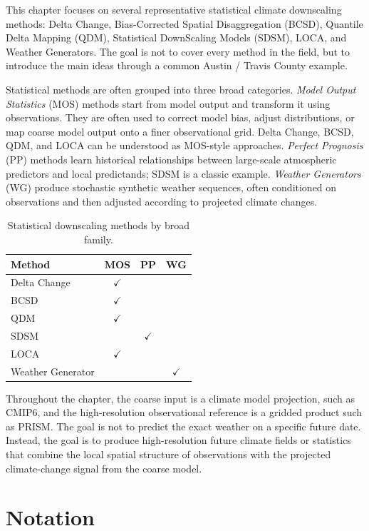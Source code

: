 \documentclass[11pt]{article}
\begin{document}
This chapter focuses on several representative statistical climate downscaling methods: Delta Change, Bias-Corrected Spatial Disaggregation (BCSD), Quantile Delta Mapping (QDM), Statistical DownScaling Models (SDSM), LOCA, and Weather Generators. The goal is not to cover every method in the field, but to introduce the main ideas through a common Austin / Travis County example.

Statistical methods are often grouped into three broad categories. \emph{Model Output Statistics} (MOS) methods start from model output and transform it using observations. They are often used to correct model bias, adjust distributions, or map coarse model output onto a finer observational grid. Delta Change, BCSD, QDM, and LOCA can be understood as MOS-style approaches. \emph{Perfect Prognosis} (PP) methods learn historical relationships between large-scale atmospheric predictors and local predictands; SDSM is a classic example. \emph{Weather Generators} (WG) produce stochastic synthetic weather sequences, often conditioned on observations and then adjusted according to projected climate changes.

\begin{table}[h]
\centering
\begin{tabular}{lccc}
\toprule
Method & MOS & PP & WG \\
\midrule
Delta Change & $\checkmark$ &  &  \\
BCSD & $\checkmark$ &  &  \\
QDM & $\checkmark$ &  &  \\
SDSM &  & $\checkmark$ &  \\
LOCA & $\checkmark$ &  &  \\
Weather Generator &  &  & $\checkmark$ \\
\bottomrule
\end{tabular}
\caption{Statistical downscaling methods by broad family.}
\end{table}

Throughout the chapter, the coarse input is a climate model projection, such as CMIP6, and the high-resolution observational reference is a gridded product such as PRISM. The goal is not to predict the exact weather on a specific future date. Instead, the goal is to produce high-resolution future climate fields or statistics that combine the local spatial structure of observations with the projected climate-change signal from the coarse model.

\section{Notation}
\end{document}
